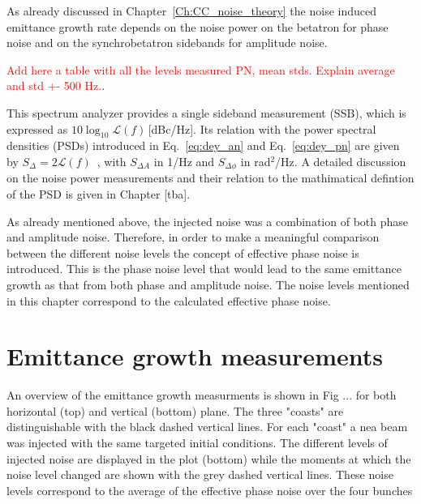 As already discussed in Chapter~\ref{Ch:CC_noise_theory} the noise induced emittance growth rate depends on the noise power on the betatron for phase noise and on the synchrobetatron sidebands for amplitude noise. 





\textcolor{red}{Add here a table with all the levels measured PN, mean stds. Explain average and std +- 500 Hz.}.


\begin{sloppypar} %
This spectrum analyzer provides a single sideband measurement (SSB), which is expressed as $10\log_{10}\mathcal{L}(f)$\,[dBc/Hz]. Its relation with the power spectral densities (PSDs) introduced in Eq.~\eqref{eq:dey_an} and Eq.~\eqref{eq:dey_pn} are given by $S_\Delta = 2\mathcal{L}(f)$~\cite{IEEE:4797525}, with $S_{\Delta A}$ in 1/Hz and $S_{\Delta\phi}$ in rad$^2$/Hz. A detailed discussion on the noise power measurements and their relation to the mathimatical defintion of the PSD is given in Chapter [tba].

As already mentioned above, the injected noise was a combination of both phase and amplitude noise. Therefore, in order to make a meaningful comparison between the different noise levels the concept of effective phase noise is introduced. This is the phase noise level that would lead to
the same emittance growth as that from both phase and
amplitude noise. The noise levels mentioned in this chapter correspond to the calculated effective phase noise.
\end{sloppypar} 



\section{Emittance growth measurements}\label{sec:EmitGrowth_measurements}

An overview of the emittance growth measurments is shown in Fig ... for both horizontal (top) and vertical (bottom) plane. The three "coasts" are distinguishable with the black dashed vertical lines. For each "coast" a nea beam was injected with the same targeted initial conditions. The different levels of injected noise are displayed in the plot (bottom) while the moments at which the noise level changed are shown with the grey dashed vertical lines. These noise levels correspond to the average of the effective phase noise over the four bunches



